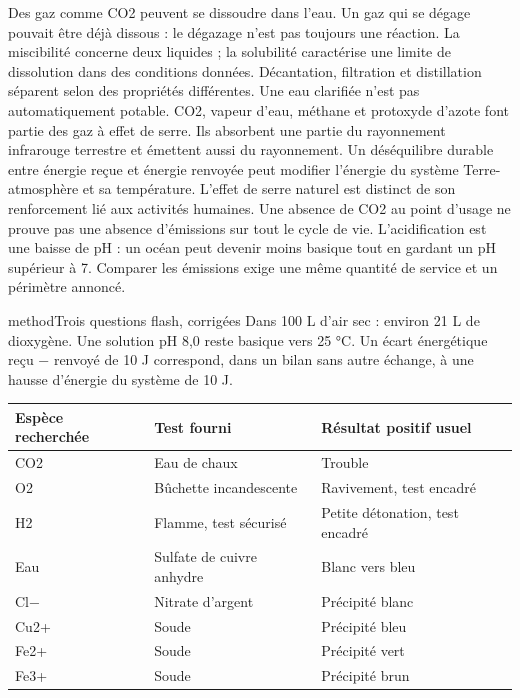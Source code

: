 Des gaz comme CO2 peuvent se dissoudre dans l’eau. Un gaz qui se dégage pouvait être déjà dissous : le dégazage n’est pas toujours une réaction. La miscibilité concerne deux liquides ; la solubilité caractérise une limite de dissolution dans des conditions données. Décantation, filtration et distillation séparent selon des propriétés différentes. Une eau clarifiée n’est pas automatiquement potable.
CO2, vapeur d’eau, méthane et protoxyde d’azote font partie des gaz à effet de serre. Ils absorbent une partie du rayonnement infrarouge terrestre et émettent aussi du rayonnement. Un déséquilibre durable entre énergie reçue et énergie renvoyée peut modifier l’énergie du système Terre-atmosphère et sa température. L’effet de serre naturel est distinct de son renforcement lié aux activités humaines.
Une absence de CO2 au point d’usage ne prouve pas une absence d’émissions sur tout le cycle de vie. L’acidification est une baisse de pH : un océan peut devenir moins basique tout en gardant un pH supérieur à 7. Comparer les émissions exige une même quantité de service et un périmètre annoncé.
\begin{pcEncadre}{method}{Trois questions flash, corrigées}
Dans 100 L d’air sec : environ 21 L de dioxygène. Une solution pH 8,0 reste basique vers 25 °C. Un écart énergétique reçu − renvoyé de 10 J correspond, dans un bilan sans autre échange, à une hausse d’énergie du système de 10 J.
\end{pcEncadre}
\label{tests}
\begingroup\renewcommand{\arraystretch}{1.45}\begin{tabularx}{\linewidth}{@{}p{32mm}p{47mm}Y@{}}\toprule
Espèce recherchée & Test fourni & Résultat positif usuel\\\midrule
CO2 & Eau de chaux & Trouble\\
O2 & Bûchette incandescente & Ravivement, test encadré\\
H2 & Flamme, test sécurisé & Petite détonation, test encadré\\
Eau & Sulfate de cuivre anhydre & Blanc vers bleu\\
Cl− & Nitrate d’argent & Précipité blanc\\
Cu2+ & Soude & Précipité bleu\\
Fe2+ & Soude & Précipité vert\\
Fe3+ & Soude & Précipité brun\\\bottomrule
\end{tabularx}\endgroup

